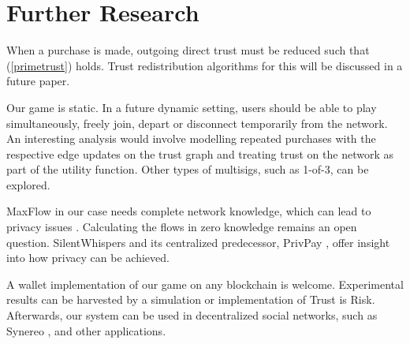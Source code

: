 \section{Further Research}

    When a purchase is made, outgoing direct trust must be reduced such that (\ref{primetrust}) holds. Trust redistribution
    algorithms for this will be discussed in a future paper.

    Our game is static. In a future dynamic setting, users should be able to play simultaneously, freely join, depart or
    disconnect temporarily from the network. An interesting analysis would involve modelling repeated purchases with the
    respective edge updates on the trust graph and treating trust on the network as part of the utility function. Other types
    of multisigs, such as 1-of-3, can be explored.

    MaxFlow in our case needs complete network knowledge, which can lead to privacy issues \cite{deanonymisation}. Calculating
    the flows in zero knowledge remains an open question. SilentWhispers \cite{silentwhispers} and its centralized
    predecessor, PrivPay \cite{privpay}, offer insight into how privacy can be achieved.

    A wallet implementation of our game on any blockchain is welcome. Experimental results can be harvested by a simulation or
    implementation of Trust is Risk. Afterwards, our system can be used in decentralized social networks, such as Synereo
    \cite{synereo}, and other applications.
